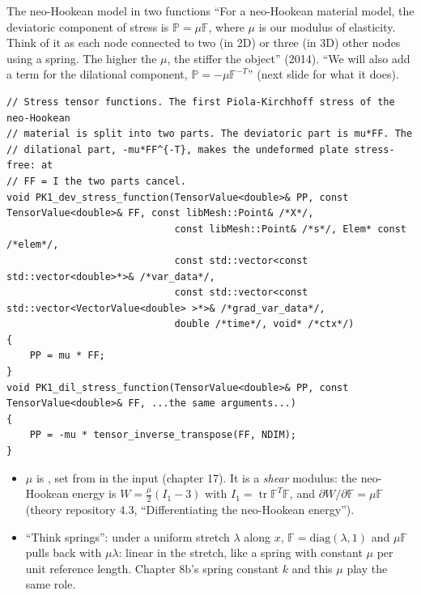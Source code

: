 \documentclass[aspectratio=169,11pt]{beamer}
\begin{document}
\begin{frame}[fragile]{The neo-Hookean model in two functions}
\label{fr:neohookean}
\scriptsize
``For a neo-Hookean material model, the deviatoric component of stress is $\mathbb{P} = \mu\mathbb{F}$, where $\mu$ is our modulus of elasticity. Think of it as each node connected to two (in 2D) or three (in 3D) other nodes using a spring. The higher the $\mu$, the stiffer the object'' (2014). ``We will also add a term for the dilational component, $\mathbb{P} = -\mu\mathbb{F}^{-T}$'' (next slide for what it does).
\begin{lstlisting}[style=cpptiny]
// Stress tensor functions. The first Piola-Kirchhoff stress of the neo-Hookean
// material is split into two parts. The deviatoric part is mu*FF. The
// dilational part, -mu*FF^{-T}, makes the undeformed plate stress-free: at
// FF = I the two parts cancel.
void PK1_dev_stress_function(TensorValue<double>& PP, const TensorValue<double>& FF, const libMesh::Point& /*X*/,
                             const libMesh::Point& /*s*/, Elem* const /*elem*/,
                             const std::vector<const std::vector<double>*>& /*var_data*/,
                             const std::vector<const std::vector<VectorValue<double> >*>& /*grad_var_data*/,
                             double /*time*/, void* /*ctx*/)
{
    PP = mu * FF;
}
void PK1_dil_stress_function(TensorValue<double>& PP, const TensorValue<double>& FF, ...the same arguments...)
{
    PP = -mu * tensor_inverse_transpose(FF, NDIM);
}
\end{lstlisting}
\begin{itemize}
  \item $\mu$ is , set from  in the input (chapter 17). It is a \emph{shear} modulus: the neo-Hookean energy is $W = \tfrac{\mu}{2}(I_1 - 3)$ with $I_1 = \operatorname{tr}\mathbb{F}^T\mathbb{F}$, and $\partial W/\partial\mathbb{F} = \mu\mathbb{F}$ (theory repository 4.3, ``Differentiating the neo-Hookean energy'').
  \item ``Think springs'': under a uniform stretch $\lambda$ along $x$, $\mathbb{F} = \mathrm{diag}(\lambda, 1)$ and $\mu\mathbb{F}$ pulls back with $\mu\lambda$: linear in the stretch, like a spring with constant $\mu$ per unit reference length. Chapter 8b's spring constant $k$ and this $\mu$ play the same role.
\end{itemize}
\end{frame}
\end{document}
